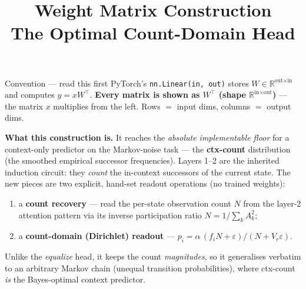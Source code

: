 \documentclass[11pt]{article}
\title{\textbf{Weight Matrix Construction\\[2pt]\large The Optimal Count-Domain Head}}
\author{}\date{}
\newcommand{\R}{\mathbb{R}}
\newcommand{\T}{^{\!\top}}
\begin{document}
\maketitle
\vspace{-3.2em}

\begin{convbox}{Convention --- read this first}
PyTorch's \texttt{nn.Linear(in,\,out)} stores $W\in\R^{\text{out}\times\text{in}}$ and computes
$y=xW\T$. \textbf{Every matrix is shown as $W\T$ (shape $\R^{\text{in}\times\text{out}}$)} --- the
matrix $x$ multiplies from the left. Rows $=$ input dims, columns $=$ output dims.

\smallskip
\textbf{What this construction is.} It reaches the \emph{absolute implementable floor} for a
context-only predictor on the Markov-noise task --- the \textbf{ctx-count} distribution (the smoothed
empirical successor frequencies). Layers 1--2 are the inherited induction circuit: they \emph{count}
the in-context successors of the current state. The new pieces are two explicit, hand-set readout
operations (no trained weights):
\begin{enumerate}[nosep,leftmargin=1.4em]
\item a \textbf{count recovery} --- read the per-state observation count $N$ from the layer-2
attention pattern via its inverse participation ratio $N=1/\sum_k A_k^2$;
\item a \textbf{count-domain (Dirichlet) readout} --- $p_i=\alpha\,(f_i N+\varepsilon)/(N+V_r\varepsilon)$.
\end{enumerate}
Unlike the \emph{equalize} head, it keeps the count \emph{magnitudes}, so it generalises verbatim to
an arbitrary Markov chain (unequal transition probabilities), where ctx-count \emph{is} the Bayes-optimal
context predictor.
\end{convbox}

\tableofcontents
\newpage

\end{document}
